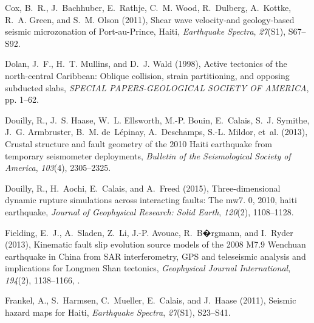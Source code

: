 \documentclass[linenumbers,draft]{agujournal}
\begin{document}
\begin{thebibliography}{62}
Cox, B.~R., J.~Bachhuber, E.~Rathje, C.~M. Wood, R.~Dulberg, A.~Kottke, R.~A.
  Green, and S.~M. Olson (2011), {Shear wave velocity-and geology-based seismic
  microzonation of Port-au-Prince, Haiti}, \textit{Earthquake Spectra},
  \textit{27}(S1), S67--S92.

Dolan, J.~F., H.~T. Mullins, and D.~J. Wald (1998), Active tectonics of the
  north-central {Caribbean: Oblique} collision, strain partitioning, and
  opposing subducted slabs, \textit{SPECIAL PAPERS-GEOLOGICAL SOCIETY OF
  AMERICA}, pp. 1--62.

Douilly, R., J.~S. Haase, W.~L. Ellsworth, M.-P. Bouin, E.~Calais, S.~J.
  Symithe, J.~G. Armbruster, B.~M. de~L{\'e}pinay, A.~Deschamps, S.-L. Mildor,
  et~al. (2013), Crustal structure and fault geometry of the 2010 {Haiti}
  earthquake from temporary seismometer deployments, \textit{Bulletin of the
  Seismological Society of America}, \textit{103}(4), 2305--2325.

Douilly, R., H.~Aochi, E.~Calais, and A.~Freed (2015), Three-dimensional
  dynamic rupture simulations across interacting faults: The mw7. 0, 2010,
  haiti earthquake, \textit{Journal of Geophysical Research: Solid Earth},
  \textit{120}(2), 1108--1128.

Fielding, E.~J., A.~Sladen, Z.~Li, J.-P. Avouac, R.~B�rgmann, and I.~Ryder
  (2013), {Kinematic fault slip evolution source models of the 2008 M7.9
  Wenchuan earthquake in China from SAR interferometry, GPS and teleseismic
  analysis and implications for Longmen Shan tectonics}, \textit{Geophysical
  Journal International}, \textit{194}(2), 1138--1166,
  .

Frankel, A., S.~Harmsen, C.~Mueller, E.~Calais, and J.~Haase (2011), {Seismic
  hazard maps for Haiti}, \textit{Earthquake Spectra}, \textit{27}(S1),
  S23--S41.


\end{thebibliography}
\end{document}
